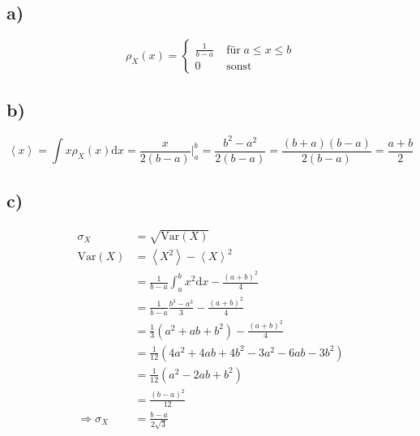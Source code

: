 \documentclass[12pt,a4paper,notitlepage]{article}
\newcommand{\diff}{\mathrm{d}}
\begin{document}
\subsection*{a)}
\begin{equation}
\rho_X(x)=\left\{\begin{matrix}\frac{1}{b-a}&\;\text{für}\;a\leq x\leq b\\0&\;\text{sonst}\end{matrix}\right.
\end{equation}
\subsection*{b)}
\begin{equation}
\left<x\right>=\int x\rho_X(x)\diff x=\frac{x}{2(b-a)}\big|_a^b=\frac{b^2-a^2}{2(b-a)}=\frac{(b+a)(b-a)}{2(b-a)}=\frac{a+b}{2}
\end{equation}
\subsection*{c)}
\begin{align}
\sigma_X&=\sqrt{\mathrm{Var}(X)}\\
\mathrm{Var}(X)&=\left<X^2\right>-\left<X\right>^2\\
&=\frac{1}{b-a}\int_a^bx^2\diff x-\frac{\left(a+b\right)^2}{4}\\
&=\frac{1}{b-a}\frac{b^3-a^3}{3}-\frac{\left(a+b\right)^2}{4}\\
&=\frac{1}{3}\left(a^2+ab+b^2\right)-\frac{\left(a+b\right)^2}{4}\\
&=\frac{1}{12}\left(4a^2+4ab+4b^2-3a^2-6ab-3b^2\right)\\
&=\frac{1}{12}\left(a^2-2ab+b^2\right)\\
&=\frac{\left(b-a\right)^2}{12}\\
\Rightarrow \sigma_X&=\frac{b-a}{2\sqrt{3}}
\end{align}
\end{document}
